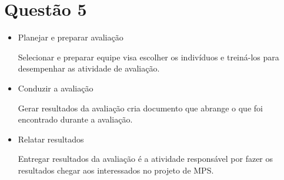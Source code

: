 \section{Questão 5} 
\begin{itemize}
    \item Planejar e preparar avaliação

    Selecionar e preparar equipe visa escolher os indivíduos e treiná-los para desempenhar as atividade de avaliação.

    \item Conduzir a avaliação

    Gerar resultados da avaliação cria documento que abrange o que foi encontrado durante a avaliação.

    \item Relatar resultados

    Entregar resultados da avaliação é a atividade responsável por fazer os resultados chegar aos interessados no projeto de MPS.
 
\end{itemize}

    
